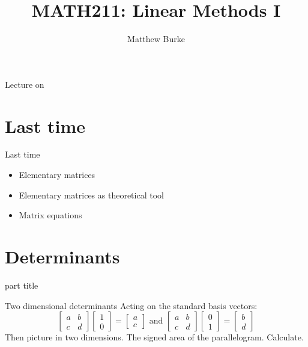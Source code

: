 \documentclass{beamer}
\title{MATH211: Linear Methods I}
\author{Matthew Burke}
\date{\lectureDate}
\newcommand{\lectureDate}{\formatdate{27}{09}{2018}}
\begin{document}
\frame{\titlepage}

\begin{frame}{Lecture on \lectureDate}
  \tableofcontents
\end{frame}

\section*{Last time}
\label{sec:Last-time}

\begin{frame}{Last time}
  \begin{itemize}
  \item Elementary matrices
  \item Elementary matrices as theoretical tool
  \item Matrix equations
  \end{itemize}
\end{frame}

\section{Determinants}

\begin{frame}
  \begin{beamercolorbox}[sep=12pt,center]{part title}
    \insertsection\par
  \end{beamercolorbox}
\end{frame}

\begin{frame}{Two dimensional determinants}
  Acting on the standard basis vectors:
  \begin{equation*}
    \left[
      \begin{array}{cc}
        a&b\\
        c&d
      \end{array}
    \right]
    \left[
      \begin{array}{c}
        1\\
        0
      \end{array}
    \right] =
    \left[
      \begin{array}{c}
        a\\
        c
      \end{array}
    \right]\text{ and }
    \left[
      \begin{array}{cc}
        a&b\\
        c&d
      \end{array}
    \right]
    \left[
      \begin{array}{c}
        0\\
        1
      \end{array}
    \right] =
    \left[
      \begin{array}{c}
        b\\
        d
      \end{array}
    \right]
  \end{equation*}
  Then picture in two dimensions.
  The signed area of the parallelogram.
  Calculate.
\end{frame}
\end{document}
